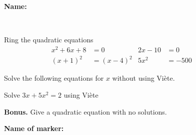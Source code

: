 \documentclass[9pt]{exam}
\begin{document}
\textbf{Name:} \dotfill

\

\large
\begin{questions}


\question[4] Ring the quadratic equations
\begin{align*}
x^2 + 6x + 8 &= 0 & 2x - 10 &= 0 &&& \\
(x+1)^2 &= (x-4)^2 & 5x^2 &= -500 &&&
\end{align*}
\fillwithdottedlines{7mm}

\question[4] Solve the following equations for $x$ without using Viète.


\question[4] Solve $3x + 5x^2 = 2$ using Viète 


\question \textbf{Bonus.} Give a quadratic equation with no solutions.


\end{questions}

\begin{tcolorbox}

\textbf{Name of marker:}

\begin{center}
\gradetable[h][questions]
\end{center}

\end{tcolorbox}
\end{document}
